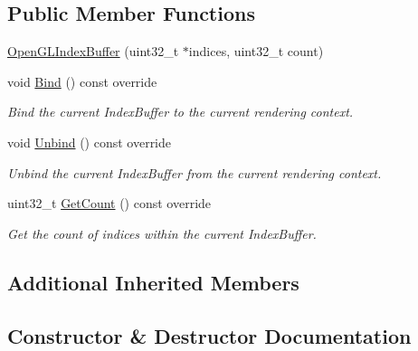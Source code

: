 \subsection*{Public Member Functions}
\begin{DoxyCompactItemize}
\item 
\hyperlink{classengine_1_1platform_1_1opengl_1_1OpenGLIndexBuffer_a88830d5185f3fd37d8274029f8d78746}{Open\+G\+L\+Index\+Buffer} (uint32\+\_\+t $\ast$indices, uint32\+\_\+t count)
\item 
\mbox{\label{classengine_1_1platform_1_1opengl_1_1OpenGLIndexBuffer_ad9279e716132e186a38fe82814f29b0f}} 
void \hyperlink{classengine_1_1platform_1_1opengl_1_1OpenGLIndexBuffer_ad9279e716132e186a38fe82814f29b0f}{Bind} () const override
\begin{DoxyCompactList}\small\item\em Bind the current Index\+Buffer to the current rendering context. \end{DoxyCompactList}\item 
void \hyperlink{classengine_1_1platform_1_1opengl_1_1OpenGLIndexBuffer_a9fc400e4c464a2dbf7df76eba359639e}{Unbind} () const override
\begin{DoxyCompactList}\small\item\em Unbind the current Index\+Buffer from the current rendering context. \end{DoxyCompactList}\item 
\mbox{\label{classengine_1_1platform_1_1opengl_1_1OpenGLIndexBuffer_a2353743de19ca153e5e1123ef0132952}} 
uint32\+\_\+t \hyperlink{classengine_1_1platform_1_1opengl_1_1OpenGLIndexBuffer_a2353743de19ca153e5e1123ef0132952}{Get\+Count} () const override
\begin{DoxyCompactList}\small\item\em Get the count of indices within the current Index\+Buffer. \end{DoxyCompactList}\end{DoxyCompactItemize}
\subsection*{Additional Inherited Members}


\subsection{Constructor \& Destructor Documentation}
\mbox{\label{classengine_1_1platform_1_1opengl_1_1OpenGLIndexBuffer_a88830d5185f3fd37d8274029f8d78746}} 
